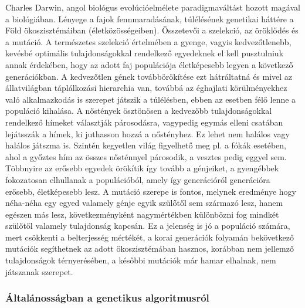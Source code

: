 \documentclass[a4paper,12pt]{article}
\begin{document}
Charles Darwin, angol biológus evolúcióelmélete paradigmaváltást hozott magával a biológiában. 
Lényege a fajok fennmaradásának, túlélésének genetikai háttére a Föld ökoszisztémáiban 
(életközösségeiben). Összetevői a szelekció, az öröklődés és a mutáció. A természetes 
szelekció értelmében a gyenge, vagyis kedvezőtlenebb, kevésbé optimális tulajdonságokkal 
rendelkező egyedeknek el kell pusztulniuk annak érdekében, hogy az adott faj populációja 
életképesebb legyen a következő generációkban. A kedvezőtlen gének továbbörökítése ezt
hátráltatná és mivel az állatvilágban táplálkozási hierarchia van, továbbá az éghajlati 
körülményekhez való alkalmazkodás is szerepet játszik a túlélésben, ebben az esetben félő 
lenne a populáció kihalása. A nőstények ösztönösen a kedvezőbb tulajdonságokkal rendelkező 
hímeket választják párosodásra, vagypedig egymás elleni csatában lejátsszák a hímek, ki 
juthasson hozzá a nőstényhez. Ez lehet nem halálos vagy halálos játszma is. Szintén kegyetlen 
világ figyelhető meg pl. a fókák esetében, ahol a győztes hím az összes nősténnyel párosodik, 
a vesztes pedig eggyel sem. Többnyire az erősebb egyedek örökítik így tovább a génjeiket, a
gyengébbek fokozatosan elhullanak a populációból, amely így generációról generációra erősebb,
életképesebb lesz. A mutáció szerepe is fontos, melynek eredménye hogy néha-néha egy egyed
valamely génje egyik szülőtől sem származó lesz, hanem egészen más lesz, következményként
nagymértékben különbözni fog mindkét szülőtől valamely tulajdonság kapcsán. Ez a jelenség is 
jó a populáció számára, mert csökkenti a belterjesség mértékét, a korai generációk folyamán
bekövetkező mutációk segíthetnek az adott ökoszisztémában hasznos, korábban nem jellemző
tulajdonságok térnyerésében, a későbbi mutációk már hamar elhalnak, nem játszanak szerepet.

\subsubsection{Általánosságban a genetikus algoritmusról}
\end{document}
